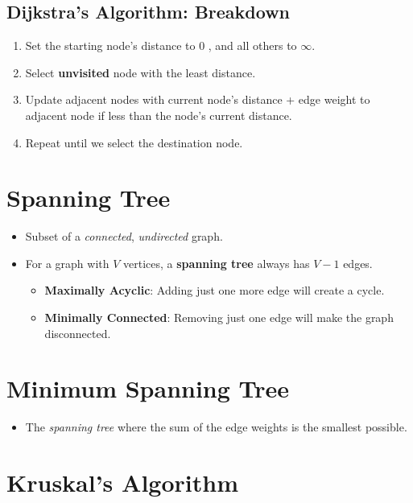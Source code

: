 \documentclass[12pt, letterpaper]{article}
\begin{document}
\subsection*{Dijkstra's Algorithm: Breakdown}

\begin{enumerate}
    \item Set the starting node's distance to $ 0 $ , and all others to $ \infty $.
    \item Select \textbf{unvisited} node with the least distance.
    \item Update adjacent nodes with current node's distance + edge weight to adjacent node if less than the node's current distance.
    \item Repeat until we select the destination node.
\end{enumerate}

\section*{Spanning Tree}

\begin{itemize}
    \item Subset of a \textit{connected}, \textit{undirected} graph.
    \item For a graph with $ V $ vertices, a \textbf{spanning tree} always has $ V - 1 $ edges.
        \begin{itemize}
            \item \textbf{Maximally Acyclic}: Adding just one more edge will create a cycle.
            \item \textbf{Minimally Connected}: Removing just one edge will make the graph disconnected.
        \end{itemize}
\end{itemize}

\section*{Minimum Spanning Tree}

\begin{itemize}
    \item The \textit{spanning tree} where the sum of the edge weights is the smallest possible.
\end{itemize}

\section*{Kruskal's Algorithm}
\end{document}

